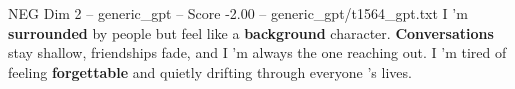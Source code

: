 \begin{textsample}{NEG Dim 2 – generic\_gpt – Score -2.00 – generic\_gpt/t1564\_gpt.txt}  \label{ex:f2_neg_007}
I ’m \textbf{surrounded} by people but feel like a \textbf{background} character. \textbf{Conversations} stay shallow, friendships fade, and I ’m always the one reaching out.
I ’m tired of feeling \textbf{forgettable} and quietly drifting through everyone ’s lives.

\end{textsample}
